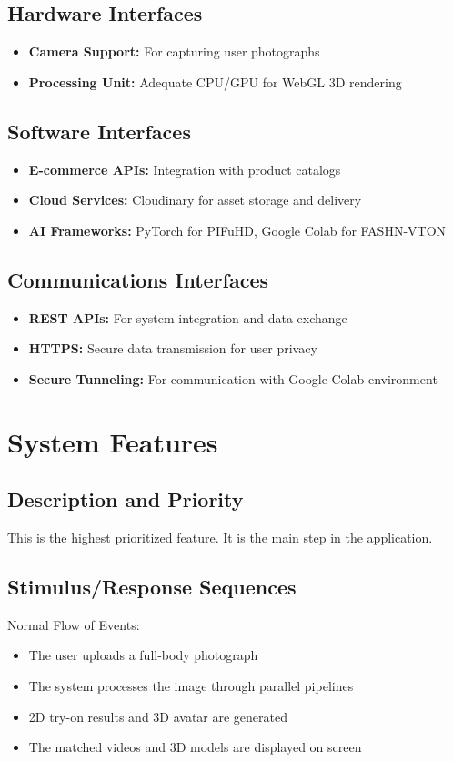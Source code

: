 \documentclass[12pt,a4paper,oneside]{report}
\begin{document}
\subsection{Hardware Interfaces}
\begin{itemize}
    \item \textbf{Camera Support:} For capturing user photographs
    \item \textbf{Processing Unit:} Adequate CPU/GPU for WebGL 3D rendering
\end{itemize}

\subsection{Software Interfaces}
\begin{itemize}
    \item \textbf{E-commerce APIs:} Integration with product catalogs
    \item \textbf{Cloud Services:} Cloudinary for asset storage and delivery
    \item \textbf{AI Frameworks:} PyTorch for PIFuHD, Google Colab for FASHN-VTON
\end{itemize}

\subsection{Communications Interfaces}
\begin{itemize}
    \item \textbf{REST APIs:} For system integration and data exchange
    \item \textbf{HTTPS:} Secure data transmission for user privacy
    \item \textbf{Secure Tunneling:} For communication with Google Colab environment
\end{itemize}

\section{System Features}

\subsection{Description and Priority}
This is the highest prioritized feature. It is the main step in the application.

\subsection{Stimulus/Response Sequences}
Normal Flow of Events:
\begin{itemize}
    \item The user uploads a full-body photograph
    \item The system processes the image through parallel pipelines
    \item 2D try-on results and 3D avatar are generated
    \item The matched videos and 3D models are displayed on screen
\end{itemize}
\end{document}
